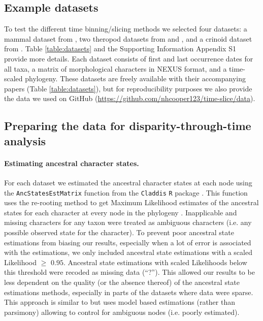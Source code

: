 \documentclass[12pt,a4paper]{article}
\begin{document}
\subsection{Example datasets}
\label{datasets}
To test the different time binning/slicing methods we selected four datasets: a mammal dataset from \cite{beckancient2014}, two theropod datasets from \cite{brusatte2014gradual} and \cite{bapst2016topology}, and a crinoid dataset from \cite{wright2017bayesian}.
Table \ref{table:datasets} and the Supporting Information Appendix S1 provide more details. 
Each dataset consists of first and last occurrence dates for all taxa, a matrix of morphological characters in NEXUS format, and a time-scaled phylogeny. 
These datasets are freely available with their accompanying papers (Table \ref{table:datasets}), but for reproducibility purposes we also provide the data we used on GitHub (\url{https://github.com/nhcooper123/time-slice/data}).

% 

\subsection{Preparing the data for disparity-through-time analysis}

\paragraph{Estimating ancestral character states.}
\label{ace}
For each dataset we estimated the ancestral character states at each node using the \texttt{AncStatesEstMatrix} function from the \texttt{Claddis} \texttt{R} package \citep{Claddis,R}.
This function uses the re-rooting method \citep{Yang01121995,Garland2000} to get Maximum Likelihood estimates of the ancestral states for each character at every node in the phylogeny \citep[based on the \texttt{rerootingMethod} function in \texttt{phytools};][]{phytools}.
Inapplicable and missing characters for any taxon were treated as ambiguous characters (i.e. any possible observed state for the character).
To prevent poor ancestral state estimations from biasing our results, especially when a lot of error is associated with the estimations, we only included ancestral state estimations with a scaled Likelihood $\geq$ $0.95$.
Ancestral state estimations with scaled Likelihoods below this threshold were recoded as missing data (``?'').
This allowed our results to be less dependent on the quality (or the absence thereof) of the ancestral state estimations methods, especially in parts of the datasets where data were sparse. 
This approach is similar to \cite{brusatte2011phylogenetic} but uses model based estimations (rather than parsimony) allowing to control for ambiguous nodes (i.e. poorly estimated).
\end{document}
